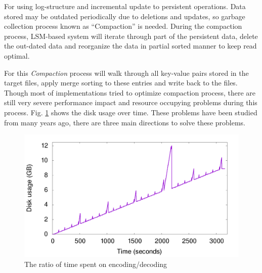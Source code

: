 For using log-structure and incremental update to persistent operations. Data stored may be outdated periodically due to deletions and updates, so garbage collection process known as ``Compaction'' is needed. During the compaction process, LSM-based system will iterate through part of the persistent data, delete the out-dated data and reorganize the data in partial sorted manner to keep read optimal.

For this \textit{Compaction} process will walk through all key-value pairs stored in the target files, apply merge sorting to these entries and write back to the files. Though most of implementations tried to optimize compaction process, there are still very severe performance impact and resource occupying problems during this process. Fig. \ref{fig:disk_usage} shows the disk usage over time. These problems have been studied from many years ago, there are three main directions to solve these problems. 

\begin{figure}
	\centering
	\includegraphics[width=0.9\columnwidth]{fig/compaction-2}
	\caption{The ratio of time spent on encoding/decoding  }
	\label{fig:disk_usage}
\end{figure}

